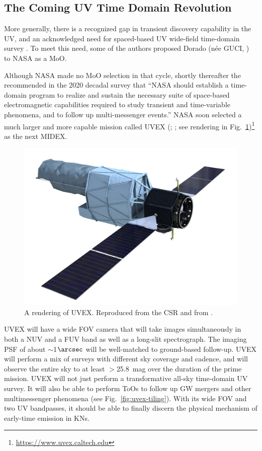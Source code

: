 \documentclass[twocolumn,times]{aastex631}
\begin{document}
\subsection{The Coming \ac{UV} Time Domain Revolution}

More generally, there is a recognized gap in transient discovery capability in the \ac{UV}, and an acknowledged need for spaced-based \ac{UV} wide-field time-domain survey \citep{2014AJ....147...79S}. To meet this need, some of the authors proposed Dorado (n\'{e}e GUCI, \citealt{2019AAS...23421203C,2023ApJ...944..126D}) to NASA as a \ac{MoO}.

Although NASA made no \ac{MoO} selection in that cycle, shortly thereafter the \citet{2021pdaa.book.....N} recommended in the 2020 decadal survey that ``NASA should establish a time-domain program to realize and sustain the necessary suite of space-based electromagnetic capabilities required to study transient and time-variable phenomena, and to follow up multi-messenger events.'' NASA soon selected a much larger and more capable mission called \acl{UVEX} (; \citealt{2021arXiv211115608K}; see rendering in Fig.~\ref{fig:render})\footnote{\url{https://www.uvex.caltech.edu}} as the next \ac{MIDEX}.

\begin{figure}
    \includegraphics[width=\columnwidth]{figures/UVEXrender}
    \caption{\label{fig:render}A rendering of \ac{UVEX}. Reproduced from the \ac{CSR} and from \citet{2021arXiv211115608K}.}
\end{figure}

\ac{UVEX} will have a wide \ac{FOV} camera that will take images simultaneously in both a \ac{NUV} and a \ac{FUV} band as well as a long-slit spectrograph. The imaging \ac{PSF} of about $\sim$1$\arcsec$ will be well-matched to ground-based follow-up. \ac{UVEX} will perform a mix of surveys with different sky coverage and cadence, and will observe the entire sky to at least $>$25.8~mag over the duration of the prime mission. \ac{UVEX} will not just perform a transformative all-sky time-domain \ac{UV} survey. It will also be able to perform \acp{ToO} to follow up \ac{GW} mergers and other multimessenger phenomena (see Fig.~\ref{fig:uvex-tiling}). With its wide \ac{FOV} and two \ac{UV} bandpasses, it should be able to finally discern the physical mechanism of early-time emission in \acp{KN}.
\end{document}
